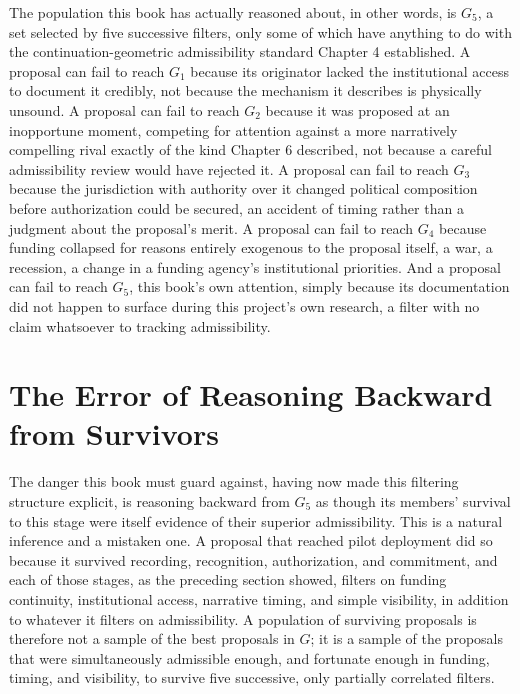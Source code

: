 \documentclass[11pt,oneside]{book}
\begin{document}
The population this book has actually reasoned about, in other words, is $G_5$, a set selected by five successive filters, only some of which have anything to do with the continuation-geometric admissibility standard Chapter 4 established. A proposal can fail to reach $G_1$ because its originator lacked the institutional access to document it credibly, not because the mechanism it describes is physically unsound. A proposal can fail to reach $G_2$ because it was proposed at an inopportune moment, competing for attention against a more narratively compelling rival exactly of the kind Chapter 6 described, not because a careful admissibility review would have rejected it. A proposal can fail to reach $G_3$ because the jurisdiction with authority over it changed political composition before authorization could be secured, an accident of timing rather than a judgment about the proposal's merit. A proposal can fail to reach $G_4$ because funding collapsed for reasons entirely exogenous to the proposal itself, a war, a recession, a change in a funding agency's institutional priorities. And a proposal can fail to reach $G_5$, this book's own attention, simply because its documentation did not happen to surface during this project's own research, a filter with no claim whatsoever to tracking admissibility.

\section*{The Error of Reasoning Backward from Survivors}

The danger this book must guard against, having now made this filtering structure explicit, is reasoning backward from $G_5$ as though its members' survival to this stage were itself evidence of their superior admissibility. This is a natural inference and a mistaken one. A proposal that reached pilot deployment did so because it survived recording, recognition, authorization, and commitment, and each of those stages, as the preceding section showed, filters on funding continuity, institutional access, narrative timing, and simple visibility, in addition to whatever it filters on admissibility. A population of surviving proposals is therefore not a sample of the best proposals in $G$; it is a sample of the proposals that were simultaneously admissible enough, and fortunate enough in funding, timing, and visibility, to survive five successive, only partially correlated filters.
\end{document}
